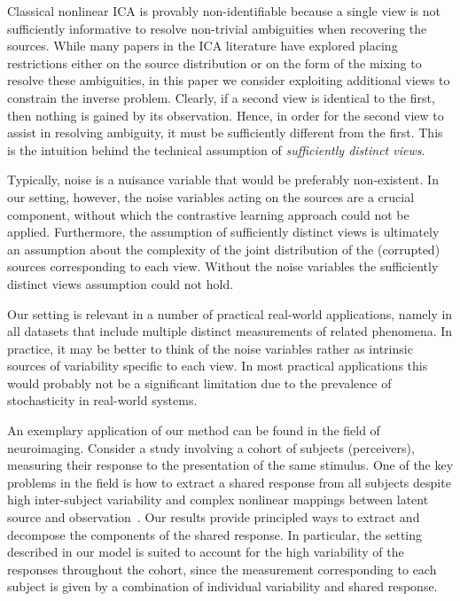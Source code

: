 Classical nonlinear ICA is provably non-identifiable because a single view is not sufficiently informative to resolve non-trivial ambiguities when recovering the sources.
While many papers in the ICA literature have explored placing restrictions either on the source distribution or on the form of the mixing to resolve these ambiguities, in this paper we consider exploiting additional views to constrain the inverse problem.
Clearly, if a second view is identical to the first, then nothing is gained by its observation.
Hence, in order for the second view to assist in resolving ambiguity, it must be sufficiently different from the first.
This is the intuition behind the technical assumption of \emph{sufficiently distinct views}.


Typically, noise is a nuisance variable that would be preferably non-existent.
In our setting, however, the noise variables acting on the sources are a crucial component, without which the contrastive learning approach could not be applied.
Furthermore, the assumption of sufficiently distinct views is ultimately an assumption about the complexity of the joint distribution of the (corrupted) sources corresponding to each view.
Without the noise variables the sufficiently distinct views assumption could not hold.


Our setting is relevant in a number of practical real-world applications, namely in all datasets that include multiple distinct measurements of related phenomena.
In practice, it may be better to think of the noise variables rather as intrinsic sources of variability specific to each view.
In most practical applications this would probably not be a significant limitation due to the prevalence of stochasticity in real-world systems.

An exemplary application of our method can be found in the field of neuroimaging.
Consider a study involving a cohort of subjects (perceivers), measuring their response to the presentation of the same stimulus.
One of the key problems in the field is how to extract a shared response from all subjects despite high inter-subject variability and complex nonlinear mappings between latent source and observation~\cite{chen2015reduced, haxby2011common}.
Our results provide principled ways to extract and decompose the components of the shared response.
In particular, the setting described in our model is suited to account for the high variability of the responses throughout the cohort, since the measurement corresponding to each subject is given by a combination of individual variability and shared response.

